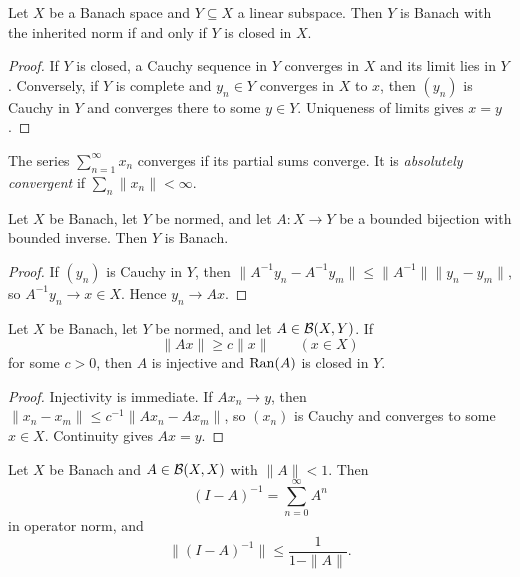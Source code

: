 \begin{notetheorem}
Let $X$ be a Banach space and $Y\subseteq X$ a linear subspace.  Then $Y$ is
Banach with the inherited norm if and only if $Y$ is closed in $X$.
\end{notetheorem}

\begin{proof}
If $Y$ is closed, a Cauchy sequence in $Y$ converges in $X$ and its limit lies
in $Y$.  Conversely, if $Y$ is complete and $y_n\in Y$ converges in $X$ to
$x$, then $(y_n)$ is Cauchy in $Y$ and converges there to some $y\in Y$.
Uniqueness of limits gives $x=y$.
\end{proof}

\begin{notedefinition}
The series $\sum_{n=1}^{\infty}x_n$ converges if its partial sums converge.
It is \emph{absolutely convergent} if $\sum_n\|x_n\|<\infty$.
\end{notedefinition}

\begin{notetheorem}
Let $X$ be Banach, let $Y$ be normed, and let
$A\colon X\to Y$ be a bounded bijection with bounded inverse.  Then $Y$ is
Banach.
\end{notetheorem}

\begin{proof}
If $(y_n)$ is Cauchy in $Y$, then
$\|A^{-1}y_n-A^{-1}y_m\|\le\|A^{-1}\|\|y_n-y_m\|$, so
$A^{-1}y_n\to x\in X$.  Hence $y_n\to Ax$.
\end{proof}

\begin{notetheorem}
Let $X$ be Banach, let $Y$ be normed, and let $A\in\mathcal{B}(X,Y)$.  If
\[
  \|Ax\|\ge c\|x\|
  \qquad(x\in X)
\]
for some $c>0$, then $A$ is injective and $\operatorname{Ran}(A)$ is closed in $Y$.
\end{notetheorem}

\begin{proof}
Injectivity is immediate.  If $Ax_n\to y$, then
$\|x_n-x_m\|\le c^{-1}\|Ax_n-Ax_m\|$, so $(x_n)$ is Cauchy and converges
to some $x\in X$.  Continuity gives $Ax=y$.
\end{proof}

\begin{notetheorem}
Let $X$ be Banach and $A\in\mathcal{B}(X,X)$ with $\|A\|<1$.  Then
\[
  (I-A)^{-1}=\sum_{n=0}^{\infty}A^n
\]
in operator norm, and
\[
  \|(I-A)^{-1}\|\le\frac1{1-\|A\|}.
\]
\end{notetheorem}

